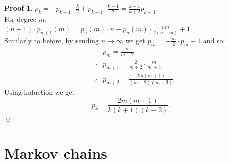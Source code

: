 \documentclass[a4paper, 12pt]{book}
\theoremstyle{definition}
\newtheorem{pro}[counter]{Proof}
\theoremstyle{remark}
\begin{document}
\begin{pro}
  $p_k = -p_{k-1} \cdot \frac{k}{2} + p_{k-1} \cdot \frac{k-1}{2} = \frac{k-1}{k+2} p_{k-1}$. \\
  For degree $m$: \\
  $(n+1) \cdot p_{n+1}(m) = p_n(m) \cdot n - p_n(m) \cdot \frac{nm}{2(n - m)} + 1$ \\
  Similarly to before, by sending $n \to \infty$ we get $p_m = -\frac{m}{2} \cdot p_m + 1$ and so:
  \begin{align*}
    &p_m = \frac{2}{m+2} \\
    \implies &p_{m+1} = \frac{2}{m+2} \cdot \frac{m}{m+3} \\
    \implies &p_{m+2} = \frac{2m(m+1)}{(m+2)(m+3)}.
  \end{align*}
  Using induction we get
  $$p_k = \frac{2m(m+1)}{k(k+1)(k+2)}.$$
  \qed
\end{pro}



\chapter{Markov chains}
\end{document}
